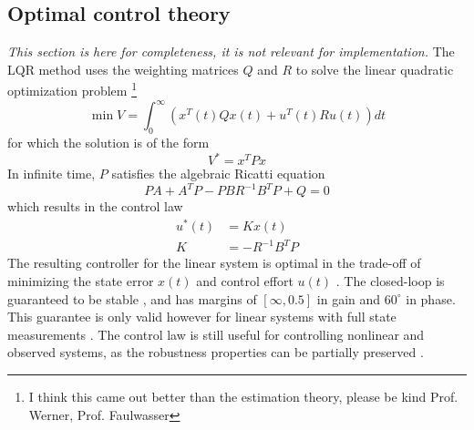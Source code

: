 \subsection{Optimal control theory}
\label{sec:controller-theory}
\textit{This section is here for completeness, it is not relevant for implementation.}
The LQR method uses the weighting matrices $Q$ and $R$ to solve the linear quadratic optimization problem \cite{werner2021b} \footnote{I think this came out better than the estimation theory, please be kind Prof. Werner, Prof. Faulwasser}
\begin{equation}
    \min V = \int_0^{\infty} (x^T(t) Q x(t) + u^T(t) R u(t)) dt
\end{equation}
for which the solution is of the form 
\begin{equation}
    V^* = x^T P x
\end{equation}
In infinite time, $P$ satisfies the algebraic Ricatti equation 
\begin{equation}
    PA + A^TP - PBR^{-1}B^TP + Q = 0
\end{equation}
which results in the control law
\begin{align}
    u^*(t) &= K x(t) \\
    K &= -R^{-1}B^TP
\end{align}
The resulting controller for the linear system is optimal in the trade-off of minimizing the state error $x(t)$ and control effort $u(t)$ \cite{werner2021}.
The closed-loop is guaranteed to be stable \cite{werner2021b}, and has margins of $[\infty, 0.5]$ in gain and $60^\circ$ in phase. 
This guarantee is only valid however for linear systems with full state measurements \cite{doyle1978}.
The control law is still useful for controlling nonlinear and observed systems, as the robustness properties can be partially preserved \cite{werner2021b}.

